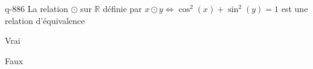 \begin{truefalse}{q-886}
La relation $\odot$ sur $\mathbb R$ définie par $x\odot y \iff \cos^2(x)+\sin^2(y)=1$ est une relation d'équivalence
\item* Vrai
\item Faux
\end{truefalse}

